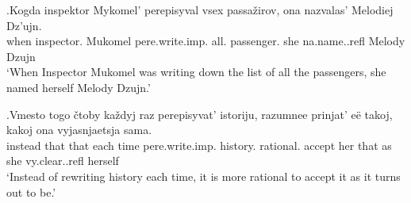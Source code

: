 \exg.\label{ex:pare:imp:distr}Kogda inspektor Mykomel' perepisyval vsex passa\v{z}irov, ona nazvalas' Melodiej Dz'ujn.\\
when inspector. Mukomel pere.write.imp. all. passenger. she na.name..refl Melody Dzujn\\
`When Inspector Mukomel was writing down the list of all the passengers, she named herself Melody Dzujn.'\\

\exg.\label{ex:pere:imp:iter}Vmesto togo \v{c}toby ka\v{z}dyj raz perepisyvat' istoriju, razumnee prinjat' e\"{e} takoj, kakoj ona vyjasnjaetsja sama.\\
instead that that each time pere.write.imp. history. rational. accept her that as she vy.clear..refl herself\\
\trans `Instead of rewriting history each time, it is more rational to accept it as it turns out to be.'

%

